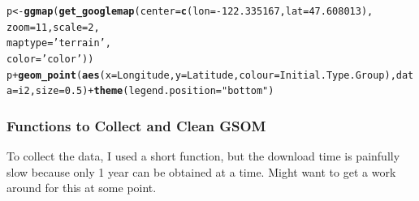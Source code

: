\documentclass{article}\usepackage[]{graphicx}\usepackage[]{color}
\makeatletter
\newcommand{\hlnum}[1]{\textcolor[rgb]{0.686,0.059,0.569}{#1}}%
\newcommand{\hlstr}[1]{\textcolor[rgb]{0.192,0.494,0.8}{#1}}%
\newcommand{\hlopt}[1]{\textcolor[rgb]{0,0,0}{#1}}%
\newcommand{\hlstd}[1]{\textcolor[rgb]{0.345,0.345,0.345}{#1}}%
\newcommand{\hlkwb}[1]{\textcolor[rgb]{0.69,0.353,0.396}{#1}}%
\newcommand{\hlkwc}[1]{\textcolor[rgb]{0.333,0.667,0.333}{#1}}%
\newcommand{\hlkwd}[1]{\textcolor[rgb]{0.737,0.353,0.396}{\textbf{#1}}}%
\newenvironment{kframe}{%
 \def\at@end@of@kframe{}%
 \ifinner\ifhmode%
  \def\at@end@of@kframe{\end{minipage}}%
  \begin{minipage}{\columnwidth}%
 \fi\fi%
 \def\FrameCommand##1{\hskip\@totalleftmargin \hskip-\fboxsep
 \colorbox{shadecolor}{##1}\hskip-\fboxsep
     \hskip-\linewidth \hskip-\@totalleftmargin \hskip\columnwidth}%
 \MakeFramed {\advance\hsize-\width
   \@totalleftmargin\z@ \linewidth\hsize
   \@setminipage}}%
 {\par\unskip\endMakeFramed%
 \at@end@of@kframe}
\newenvironment{knitrout}{}{} %
\makeatother
\begin{document}
\begin{knitrout}
\begin{kframe}
\begin{alltt}
\hlstd{p} \hlkwb{<-} \hlkwd{ggmap}\hlstd{(}\hlkwd{get_googlemap}\hlstd{(}\hlkwc{center} \hlstd{=} \hlkwd{c}\hlstd{(}\hlkwc{lon} \hlstd{=} \hlopt{-}\hlnum{122.335167}\hlstd{,} \hlkwc{lat} \hlstd{=} \hlnum{47.608013}\hlstd{),}
                    \hlkwc{zoom} \hlstd{=} \hlnum{11}\hlstd{,} \hlkwc{scale} \hlstd{=} \hlnum{2}\hlstd{,}
                    \hlkwc{maptype} \hlstd{=}\hlstr{'terrain'}\hlstd{,}
                    \hlkwc{color} \hlstd{=} \hlstr{'color'}\hlstd{))}
\hlstd{p} \hlopt{+} \hlkwd{geom_point}\hlstd{(}\hlkwd{aes}\hlstd{(}\hlkwc{x} \hlstd{= Longitude,} \hlkwc{y} \hlstd{= Latitude,}  \hlkwc{colour} \hlstd{= Initial.Type.Group),} \hlkwc{data} \hlstd{= i2,} \hlkwc{size} \hlstd{=} \hlnum{0.5}\hlstd{)} \hlopt{+} \hlkwd{theme}\hlstd{(}\hlkwc{legend.position}\hlstd{=}\hlstr{"bottom"}\hlstd{)}
\end{alltt}
\end{kframe}
\end{knitrout}

\subsubsection{Functions to Collect and Clean GSOM}

To collect the data, I used a short function, but the download time is painfully slow because only 1 year can be obtained at a time. Might want to get a work around for this at some point. 
\end{document}
